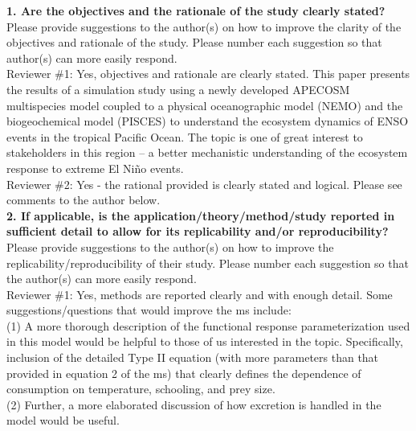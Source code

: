 \documentclass{article}
\begin{document}
\textbf{1. Are the objectives and the rationale of the study clearly stated?} \\

Please provide suggestions to the author(s) on how to improve the clarity of the objectives and rationale of the study. Please number each suggestion so that author(s) can more easily respond.\\

Reviewer \#1: Yes, objectives and rationale are clearly stated. This paper presents the results of a simulation study using a newly developed APECOSM multispecies model coupled to a physical oceanographic model (NEMO) and the biogeochemical model (PISCES) to understand the ecosystem dynamics of ENSO events in the tropical Pacific Ocean. The topic is one of great interest to stakeholders in this region – a better mechanistic understanding of the ecosystem response to extreme El Niño events. \\

Reviewer \#2: Yes - the rational provided is clearly stated and logical. Please see comments to the author below.\\

\textbf{2. If applicable, is the application/theory/method/study reported in sufficient detail to allow for its replicability and/or reproducibility?} \\ 

Please provide suggestions to the author(s) on how to improve the replicability/reproducibility of their study. Please number each suggestion so that the author(s) can more easily respond. \\

Reviewer \#1: Yes, methods are reported clearly and with enough detail. Some suggestions/questions that would improve the ms include: \\

(1) A more thorough description of the functional response parameterization used in this model would be helpful to those of us interested in the topic. Specifically, inclusion of the detailed Type II equation (with more parameters than that provided in equation 2 of the ms) that clearly defines the dependence of consumption on temperature, schooling, and prey size. \\


(2) Further, a more elaborated discussion of how excretion is handled in the model would be useful. \\ 
\end{document}
